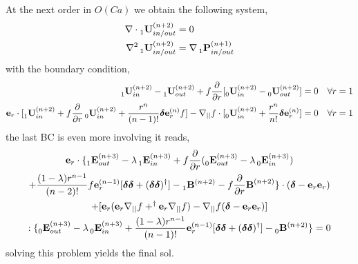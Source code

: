 At the next order in $O(Ca)$ we obtain the following system, 
\begin{align*}
    \mathbf{\nabla}\cdot \prescript{}{1}{\textbf{U}}_{in/out}^{(n+2)} &= 0 \\
    \mathbf{\nabla}^2\prescript{}{1}{\textbf{U}}_{in/out}^{(n+2)} &= \mathbf{\nabla} \prescript{}{1}{\textbf{P}}_{in/out}^{(n+1)} \\
\end{align*}
with the boundary condition, 
\begin{align}
    \prescript{}{1}{\textbf{U}}_{in}^{(n+2)} - \prescript{}{1}{\textbf{U}}_{out}^{(n+2)}
    + f\frac{\partial}{\partial r} [\prescript{}{0}{\textbf{U}}_{in}^{(n+2)} - \prescript{}{0}{\textbf{U}}_{out}^{(n+2)}]
    &=
    0
    &&\forall r = 1 
    \\
    \textbf{e}_r\cdot [
    \prescript{}{1}{\textbf{U}}_{in}^{(n+2)} 
    + f\frac{\partial}{\partial r}\prescript{}{0}{\textbf{U}}_{in}^{(n+2)} 
    +\frac{r^n}{(n-1)!}\bm\delta \textbf{e}_r^{(n)} f ] 
    - \mathbf{\nabla}_{||} f \cdot [\prescript{}{0}{\textbf{U}}_{in}^{(n+2)} 
    +\frac{r^n}{n!}\bm\delta \textbf{e}_r^{(n)}] &= 0 
    &&\forall r = 1 
\end{align}
the last BC is even more involving it reads, 
\begin{multline}
    \textbf{e}_r\cdot \{
        \prescript{}{1}{\textbf{E}}_{out}^{(n+3)}
        -\lambda\prescript{}{1}{\textbf{E}}_{in}^{(n+3)}
        + f \frac{\partial}{\partial r}(\prescript{}{0}{\textbf{E}}_{out}^{(n+3)}
        -\lambda\prescript{}{0}{\textbf{E}}_{in}^{(n+3)})\\
        +\frac{(1-\lambda)r^{n-1}}{(n-2)!}
        f \textbf{e}_r^{(n-1)}[\bm\delta\bm\delta + (\bm\delta\bm\delta)^\dagger]
        - \prescript{}{1}{\textbf{B}}^{(n+2)}
        - f \frac{\partial}{\partial r}\textbf{B}^{(n+2)}
    \}\cdot (\bm\delta - \textbf{e}_r \textbf{e}_r)\\
    + [\textbf{e}_r (\textbf{e}_r \mathbf{\nabla}_{||} f + ^\dagger \textbf{e}_r \mathbf{\nabla}_{||} f) - \mathbf{\nabla}_{||} f (\bm\delta - \textbf{e}_r \textbf{e}_r) ] \\: \{
        \prescript{}{0}{\textbf{E}}_{out}^{(n+3)}
        -\lambda\prescript{}{0}{\textbf{E}}_{in}^{(n+3)}
        +\frac{(1-\lambda)r^{n-1}}{(n-1)!}
        \textbf{e}_r^{(n-1)}[\bm\delta\bm\delta + (\bm\delta\bm\delta)^\dagger]
        - \prescript{}{0}{\textbf{B}}^{(n+2)}
    \} 
    =
    0
\end{multline}
solving this problem yields the final sol. 

